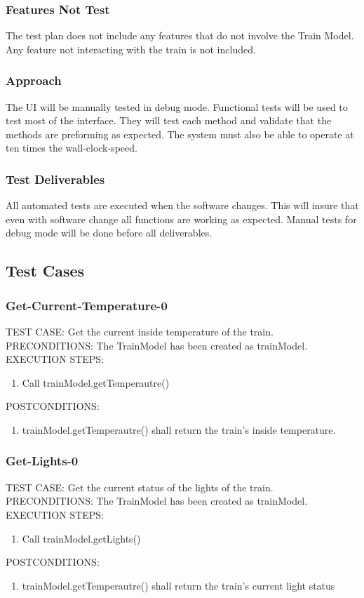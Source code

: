 \documentclass{scrreprt}
\begin{document}
\subsubsection{Features Not Test}
The test plan does not include any features that do not involve the Train Model. Any feature not interacting with the train is not included.
\subsubsection{Approach}
The UI will be manually tested in debug mode. Functional tests will be used to test most of the interface. They will test each method and validate that the methods are preforming as expected. The system must also be able to operate at ten times the wall-clock-speed.
\subsubsection{Test Deliverables}
All automated tests are executed when the software changes. This will insure that even with software change all functions are working as expected. Manual tests for debug mode will be done before all deliverables.
\subsection{Test Cases}

\subsubsection{Get-Current-Temperature-0}
TEST CASE: Get the current inside temperature of the train.
PRECONDITIONS: The TrainModel has been created as trainModel.
EXECUTION STEPS:
\begin{enumerate}
	\item Call trainModel.getTemperautre()
\end{enumerate}
POSTCONDITIONS:
\begin{enumerate}
	\item trainModel.getTemperautre() shall return the train's inside temperature.
\end{enumerate}

\subsubsection{Get-Lights-0}
TEST CASE: Get the current status of the lights of the train.
PRECONDITIONS: The TrainModel has been created as trainModel.
EXECUTION STEPS:
\begin{enumerate}
	\item Call trainModel.getLights()
\end{enumerate}
POSTCONDITIONS:
\begin{enumerate}
	\item trainModel.getTemperautre() shall return the train's current light status
\end{enumerate}
\end{document}
